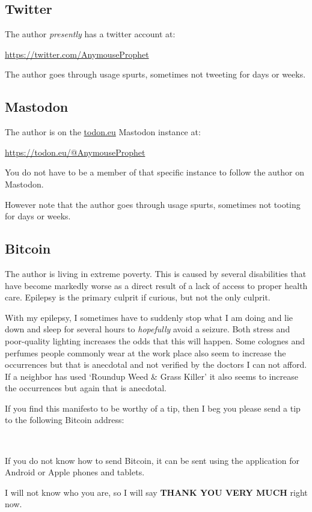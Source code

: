 \subsection{Twitter}

The author \emph{presently} has a twitter account at:

\bigskip

\url{https://twitter.com/AnymouseProphet}

\bigskip

The author goes through usage spurts, sometimes not tweeting for days or weeks.

\subsection{Mastodon}

The author is on the \url{todon.eu} Mastodon instance at:

\bigskip

\url{https://todon.eu/@AnymouseProphet}

\bigskip

You do not have to be a member of that specific instance to follow the author on Mastodon.

However note that the author goes through usage spurts, sometimes not tooting for days or weeks.

\subsection{Bitcoin}

The author is living in extreme poverty. This is caused by several disabilities that have become markedly worse as a direct result of a lack of access to proper health care. Epilepsy is the primary culprit if curious, but not the only culprit.

With my epilepsy, I sometimes have to suddenly stop what I am doing and lie down and sleep for several hours to \emph{hopefully} avoid a seizure. Both stress and poor-quality lighting increases the odds that this will happen. Some colognes and perfumes people commonly wear at the work place also seem to increase the occurrences but that is anecdotal and not verified by the doctors I can not afford. If a neighbor has used `Roundup\textregistered{} Weed \& Grass Killer' it also seems to increase the occurrences but again that is anecdotal.

If you find this manifesto to be worthy of a tip, then I beg you please send a tip to the following Bitcoin address:

\begin{center}
\\
\hfill \break
{}
\end{center}


If you do not know how to send Bitcoin, it can be sent using the  application for Android or Apple phones and tablets.

I will not know who you are, so I will say \textbf{THANK YOU VERY MUCH} right now.
